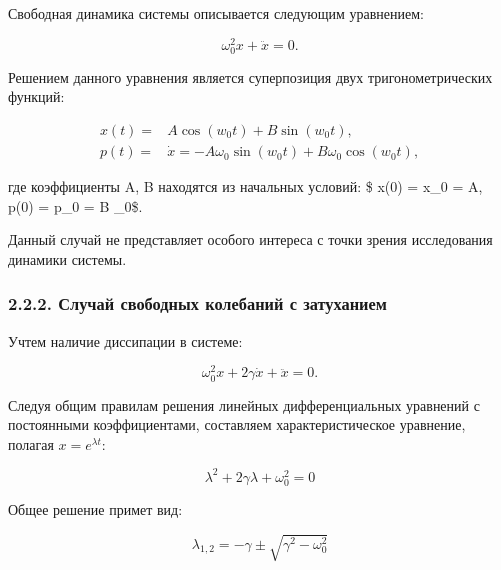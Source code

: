 \documentclass[11pt]{article}
\begin{document}
Свободная динамика системы описывается следующим уравнением:

\begin{equation}
    \omega_{0}^{2} x  +\ddot{x}=0.
\end{equation}

Решением данного уравнения является суперпозиция двух тригонометрических
функций:

\begin{align}
    x(t) = & A \cos(w_0 t) + B \sin(w_0 t), \\
    p(t) = & \dot{x} = -A \omega_0 \sin(w_0 t) + B \omega_0 \cos(w_0 t),
\end{align}

где коэффициенты A, B находятся из начальных условий: \$ x(0) = x\_0 =
A, p(0) = p\_0 = B \omega\_0\$.

Данный случай не представляет особого интереса с точки зрения
исследования динамики системы.

\hypertarget{ux441ux43bux443ux447ux430ux439-ux441ux432ux43eux431ux43eux434ux43dux44bux445-ux43aux43eux43bux435ux431ux430ux43dux438ux439-ux441-ux437ux430ux442ux443ux445ux430ux43dux438ux435ux43c}{%
\subsubsection{2.2.2. Случай свободных колебаний с
затуханием}\label{ux441ux43bux443ux447ux430ux439-ux441ux432ux43eux431ux43eux434ux43dux44bux445-ux43aux43eux43bux435ux431ux430ux43dux438ux439-ux441-ux437ux430ux442ux443ux445ux430ux43dux438ux435ux43c}}

Учтем наличие диссипации в системе:

\begin{equation}
    \omega_{0}^{2} x + 2 \gamma \dot{x}  +\ddot{x} = 0.
\end{equation}

Следуя общим правилам решения линейных дифференциальных уравнений с
постоянными коэффициентами, составляем характеристическое уравнение,
полагая \(x = e^{\lambda t}\):

\begin{equation}
    \lambda^2 + 2\gamma \lambda + \omega_0^2 = 0
\end{equation}

Общее решение примет вид:

\begin{equation}
    \lambda_{1,2} = -\gamma \pm \sqrt{\gamma^2 - \omega_0^2}
\end{equation}
\end{document}

